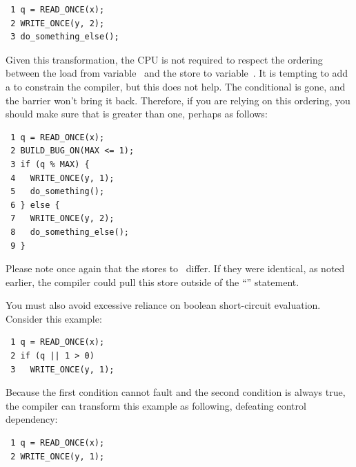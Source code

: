 \begin{enumerate}
\vspace{5pt}
\begin{minipage}[t]{\columnwidth}
\scriptsize
\begin{verbatim}
 1 q = READ_ONCE(x);
 2 WRITE_ONCE(y, 2);
 3 do_something_else();
\end{verbatim}
\end{minipage}
\vspace{5pt}

Given this transformation, the CPU is not required to respect the ordering
between the load from variable~ and the store to variable~.
It is tempting to add a  to constrain the compiler,
but this does not help.
The conditional is gone, and the barrier won't bring it back.
Therefore, if you are relying on this ordering, you should make sure
that  is greater than one, perhaps as follows:

\vspace{5pt}
\begin{minipage}[t]{\columnwidth}
\scriptsize
\begin{verbatim}
 1 q = READ_ONCE(x);
 2 BUILD_BUG_ON(MAX <= 1);
 3 if (q % MAX) {
 4   WRITE_ONCE(y, 1);
 5   do_something();
 6 } else {
 7   WRITE_ONCE(y, 2);
 8   do_something_else();
 9 }
\end{verbatim}
\end{minipage}
\vspace{5pt}

Please note once again that the stores to~ differ.
If they were identical, as noted earlier, the compiler could pull this
store outside of the ``'' statement.

You must also avoid excessive reliance on boolean short-circuit evaluation.
Consider this example:

\vspace{5pt}
\begin{minipage}[t]{\columnwidth}
\scriptsize
\begin{verbatim}
 1 q = READ_ONCE(x);
 2 if (q || 1 > 0)
 3   WRITE_ONCE(y, 1);
\end{verbatim}
\end{minipage}
\vspace{5pt}

Because the first condition cannot fault and the second condition is
always true, the compiler can transform this example as following,
defeating control dependency:

\vspace{5pt}
\begin{minipage}[t]{\columnwidth}
\scriptsize
\begin{verbatim}
 1 q = READ_ONCE(x);
 2 WRITE_ONCE(y, 1);
\end{verbatim}
\end{minipage}
\vspace{5pt}


\end{enumerate}
